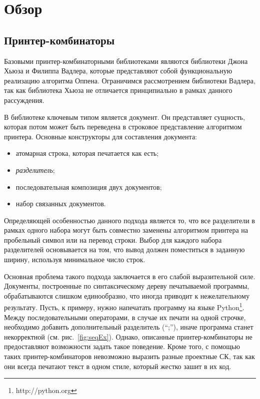 \section{Обзор}

\subsection{Принтер-комбинаторы}

Базовыми принтер-комбинаторными библиотеками являются библиотеки
Джона Хьюза\cite{hughes} и Филиппа Вадлера\cite{wadler}, которые
представляют собой функциональную реализацию алгоритма
Оппена\cite{oppen}.
Ограничимся рассмотрением библиотеки Вадлера, так как
библиотека Хьюза не отличается принципиально
в рамках данного рассуждения.

В библиотеке ключевым типом является документ.
Он представляет сущность, которая потом может
быть переведена в строковое представление алгоритмом принтера.
Основные конструкторы для составления документа:
\begin{itemize}
  \item атомарная строка, которая печатается как есть;
  \item \emph{разделитель};
  \item последовательная композиция двух документов;
  \item набор связанных документов.
\end{itemize}

Определяющей особенностью данного подхода является то, что все разделители
в рамках одного набора могут быть совместно заменены алгоритмом принтера
на пробельный символ или на перевод строки. Выбор для каждого набора разделителей
основывается на том, что вывод должен поместиться в заданную ширину,
используя минимальное число строк.

Основная проблема такого подхода заключается в его слабой выразительной силе.
Документы, построенные по синтаксическому дереву печатываемой программы,
обрабатываются слишком единообразно, что иногда приводит к нежелательному результату.
Пусть, к примеру, нужно напечатать программу на языке Python\footnote{http://python.org}.
Между последовательными операторами, в случае их печати на одной строчке, необходимо
добавить дополнительный разделитель (``;''), иначе программа станет некорректной
(см. рис.~\ref{fig:seqEx}). Однако, описанные принтер-комбинаторы не предоставляют
возможности задать такое поведение.
Кроме того, с помощью таких принтер-комбинаторов невозможно выразить разные проектные СК,
так как они всегда печатают текст в одном стиле, который жестко зашит в их код.

